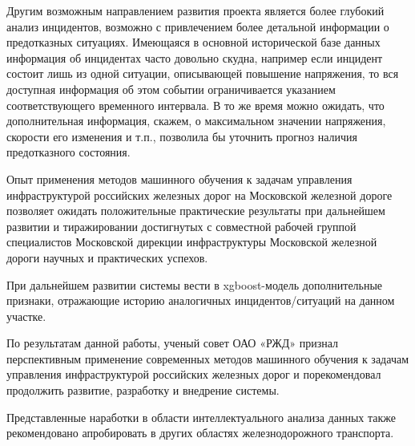 Другим возможным направлением развития проекта является более глубокий анализ инцидентов, возможно с привлечением более детальной информации о предотказных ситуациях. Имеющаяся в основной исторической базе данных информация об инцидентах часто довольно скудна, например если инцидент состоит лишь из одной ситуации, описывающей повышение напряжения, то вся доступная информация об этом событии ограничивается указанием соответствующего временного интервала. В то же время можно ожидать, что дополнительная информация, скажем, о максимальном значении напряжения, скорости его изменения и т.п., позволила бы уточнить прогноз наличия предотказного состояния.


Опыт применения методов машинного обучения к задачам управления инфраструктурой российских железных дорог на Московской железной дороге позволяет ожидать положительные практические результаты при дальнейшем развитии и тиражировании достигнутых с совместной рабочей группой специалистов Московской дирекции инфраструктуры Московской железной дороги научных и практических успехов.

При дальнейшем развитии системы вести в xgboost-модель дополнительные признаки, отражающие историю аналогичных инцидентов/ситуаций на данном участке.

По результатам данной работы, ученый совет ОАО «РЖД» признал перспективным применение современных методов машинного обучения к задачам управления инфраструктурой российских железных дорог и порекомендовал продолжить развитие, разработку и внедрение системы. 

Представленные наработки в области интеллектуального анализа данных также рекомендовано апробировать в других областях железнодорожного транспорта.